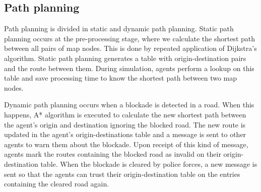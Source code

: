 \subsection{Path planning}
\label{sec:path}

Path planning is divided in static and dynamic path planning. Static path planning occurs at the pre-processing stage, where we calculate the shortest path between all pairs of map nodes. This is done by repeated application of Dijkstra's algorithm. Static path planning generates a table with origin-destination pairs and the route between them. During simulation, agents perform a lookup on this table and save processing time to know the shortest path between two map nodes.

Dynamic path planning occurs when a blockade is detected in a road. When this happens, A* algorithm is executed to calculate the new shortest path between the agent's origin and destination ignoring the blocked road. The new route is updated in the agent's origin-destinations table and a message is sent to other agents to warn them about the blockade. Upon receipt of this kind of message, agents mark the routes containing the blocked road as invalid on their origin-destination table. When the blockade is cleared by police forces, a new message is sent so that the agents can trust their origin-destination table on the entries containing the cleared road again.
